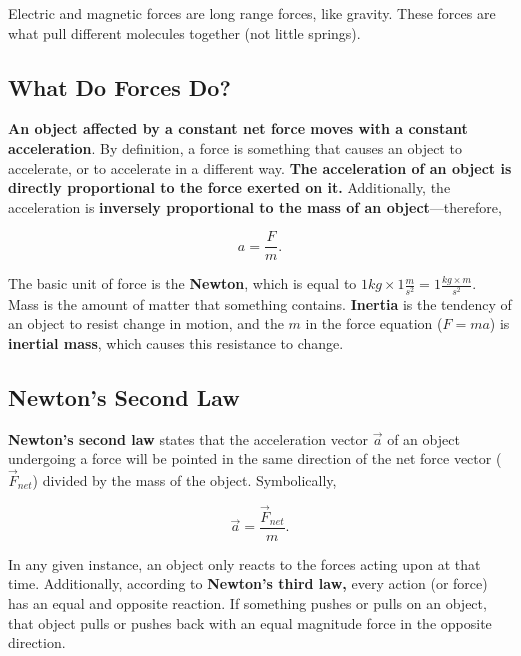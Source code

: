 \documentclass[12pt,letterpaper]{article}
\begin{document}
Electric and magnetic forces are long range forces, like gravity. These forces are what pull different molecules together (not little springs).

\subsection[What Do Forces Do?]{What Do Forces Do?}

\textbf{An object affected by a constant net force moves with a constant acceleration}. By definition, a force is something that causes an object to accelerate, or to accelerate in a different way. \textbf{The acceleration of an object is directly proportional to the force exerted on it.} Additionally, the acceleration is \textbf{inversely proportional to the mass of an object}---therefore,

\begin{center}
	$$a = \frac{F}{m}.$$\linebreak
\end{center}

The basic unit of force is the \textbf{Newton}, which is equal to $1 kg \times 1 \frac{m}{s^{2}} = 1 \frac{kg \times m}{s^{2}}$. \\

Mass is the amount of matter that something contains. \textbf{Inertia} is the tendency of an object to resist change in motion, and the $m$ in the force equation ($F = ma$) is \textbf{inertial mass}, which causes this resistance to change.

\subsection[Newton's Second Law]{Newton's Second Law}

\textbf{Newton's second law} states that the acceleration vector $\vec{a}$ of an object undergoing a force will be pointed in the same direction of the net force vector ($\vec{F}_{net}$) divided by the mass of the object. Symbolically,

\begin{center}
	$$\vec{a} = \frac{\vec{F}_{net}}{m}.$$\linebreak
\end{center}

In any given instance, an object only reacts to the forces acting upon at that time. Additionally, according to \textbf{Newton's third law,} every action (or force) has an equal and opposite reaction. If something pushes or pulls on an object, that object pulls or pushes back with an equal magnitude force in the opposite direction. \\
\end{document}
